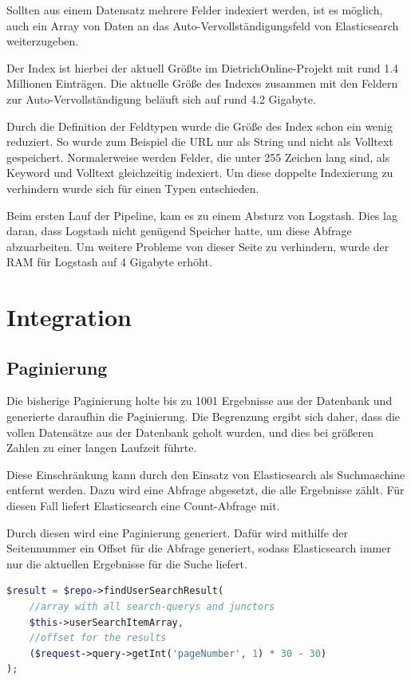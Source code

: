 Sollten aus einem Datensatz mehrere Felder indexiert werden, ist es möglich, auch ein Array von Daten an das Auto-Vervollständigungsfeld von Elasticsearch weiterzugeben.

Der Index ist hierbei der aktuell Größte im DietrichOnline-Projekt mit rund 1.4 Millionen Einträgen. Die aktuelle Größe des Indexes zusammen mit den Feldern zur Auto-Vervollständigung beläuft sich auf rund 4.2 Gigabyte. 

Durch die Definition der Feldtypen wurde die Größe des Index schon ein wenig reduziert. So wurde zum Beispiel die URL nur als String und nicht als Volltext gespeichert. Normalerweise werden Felder, die unter 255 Zeichen lang sind, als Keyword und Volltext gleichzeitig indexiert. Um diese doppelte Indexierung zu verhindern wurde sich für einen Typen entschieden.

Beim ersten Lauf der Pipeline, kam es zu einem Absturz von Logstash. Dies lag daran, dass Logstash nicht genügend Speicher hatte, um diese Abfrage abzuarbeiten. Um weitere Probleme von dieser Seite zu verhindern, wurde der RAM für Logstash auf 4 Gigabyte erhöht.

\section{Integration}

\subsection{Paginierung}

Die bisherige Paginierung holte bis zu 1001 Ergebnisse aus der Datenbank und generierte daraufhin die Paginierung. Die Begrenzung ergibt sich daher, dass die vollen Datensätze aus der Datenbank geholt wurden, und dies bei größeren Zahlen zu einer langen Laufzeit führte.

Diese Einschränkung kann durch den Einsatz von Elasticsearch als Suchmaschine entfernt werden. Dazu wird eine Abfrage abgesetzt, die alle Ergebnisse zählt. Für diesen Fall liefert Elasticsearch eine Count-Abfrage mit.

Durch diesen wird eine Paginierung generiert. Dafür wird mithilfe der Seitennummer ein Offset für die Abfrage generiert, sodass Elasticsearch immer nur die aktuellen Ergebnisse für die Suche liefert.

\begin{lstlisting}[language=PHP, frame=single, label={lst:generierung},  caption=Generierung des Offsets für die Paginierung,captionpos=b] 
$result = $repo->findUserSearchResult(
    //array with all search-querys and junctors
    $this->userSearchItemArray, 
    //offset for the results
    ($request->query->getInt('pageNumber', 1) * 30 - 30)
);
\end{lstlisting}

